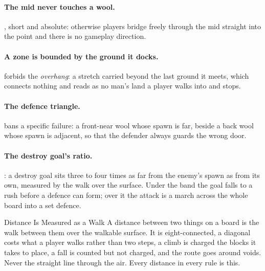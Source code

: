 \paragraph{The mid never touches a wool.} , short and absolute: otherwise
players bridge freely through the mid straight into the point and there is no
gameplay direction.

\paragraph{A zone is bounded by the ground it docks.}  forbids the
\emph{overhang}: a stretch carried beyond the last ground it meets, which connects
nothing and reads as no man's land a player walks into and stops.

\paragraph{The defence triangle.}  bans a specific failure: a front-near
wool whose spawn is far, beside a back wool whose spawn is adjacent, so that the
defender always guards the wrong door.

\paragraph{The destroy goal's ratio.} : a destroy goal sits three to four
times as far from the enemy's spawn as from its own, measured by the walk over the
surface. Under the band the goal falls to a rush before a defence can form; over
it the attack is a march across the whole board into a set defence.

\begin{ruling}{Distance Is Measured as a Walk}
A distance between two things on a board is the walk between them over the
walkable surface. It is eight-connected, a diagonal costs what a player walks
rather than two steps, a climb is charged the blocks it takes to place, a fall is
counted but not charged, and the route goes around voids. Never the straight line through the air. Every
distance in every rule is this.
\end{ruling}
